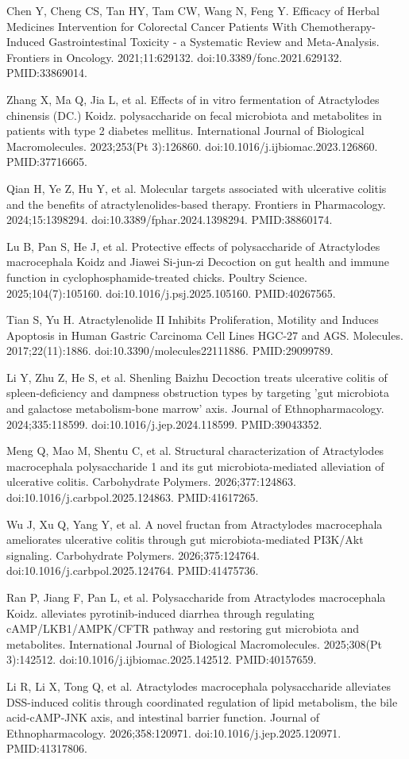 \documentclass[11pt,oneside]{book}
\newcommand{\reff}[2]{\par\hangindent=7mm\hangafter=1\noindent[#1]\hspace{2mm}#2\par}
\begin{document}
\reff{40}{Chen Y, Cheng CS, Tan HY, Tam CW, Wang N, Feng Y. Efficacy of Herbal Medicines Intervention for Colorectal Cancer Patients With Chemotherapy-Induced Gastrointestinal Toxicity - a Systematic Review and Meta-Analysis. Frontiers in Oncology. 2021;11:629132. doi:10.3389/fonc.2021.629132. PMID:33869014.}
\reff{41}{Zhang X, Ma Q, Jia L, et al. Effects of in vitro fermentation of Atractylodes chinensis (DC.) Koidz. polysaccharide on fecal microbiota and metabolites in patients with type 2 diabetes mellitus. International Journal of Biological Macromolecules. 2023;253(Pt 3):126860. doi:10.1016/j.ijbiomac.2023.126860. PMID:37716665.}
\reff{42}{Qian H, Ye Z, Hu Y, et al. Molecular targets associated with ulcerative colitis and the benefits of atractylenolides-based therapy. Frontiers in Pharmacology. 2024;15:1398294. doi:10.3389/fphar.2024.1398294. PMID:38860174.}
\reff{43}{Lu B, Pan S, He J, et al. Protective effects of polysaccharide of Atractylodes macrocephala Koidz and Jiawei Si-jun-zi Decoction on gut health and immune function in cyclophosphamide-treated chicks. Poultry Science. 2025;104(7):105160. doi:10.1016/j.psj.2025.105160. PMID:40267565.}
\reff{44}{Tian S, Yu H. Atractylenolide II Inhibits Proliferation, Motility and Induces Apoptosis in Human Gastric Carcinoma Cell Lines HGC-27 and AGS. Molecules. 2017;22(11):1886. doi:10.3390/molecules22111886. PMID:29099789.}
\reff{45}{Li Y, Zhu Z, He S, et al. Shenling Baizhu Decoction treats ulcerative colitis of spleen-deficiency and dampness obstruction types by targeting 'gut microbiota and galactose metabolism-bone marrow' axis. Journal of Ethnopharmacology. 2024;335:118599. doi:10.1016/j.jep.2024.118599. PMID:39043352.}
\reff{46}{Meng Q, Mao M, Shentu C, et al. Structural characterization of Atractylodes macrocephala polysaccharide 1 and its gut microbiota-mediated alleviation of ulcerative colitis. Carbohydrate Polymers. 2026;377:124863. doi:10.1016/j.carbpol.2025.124863. PMID:41617265.}
\reff{47}{Wu J, Xu Q, Yang Y, et al. A novel fructan from Atractylodes macrocephala ameliorates ulcerative colitis through gut microbiota-mediated PI3K/Akt signaling. Carbohydrate Polymers. 2026;375:124764. doi:10.1016/j.carbpol.2025.124764. PMID:41475736.}
\reff{48}{Ran P, Jiang F, Pan L, et al. Polysaccharide from Atractylodes macrocephala Koidz. alleviates pyrotinib-induced diarrhea through regulating cAMP/LKB1/AMPK/CFTR pathway and restoring gut microbiota and metabolites. International Journal of Biological Macromolecules. 2025;308(Pt 3):142512. doi:10.1016/j.ijbiomac.2025.142512. PMID:40157659.}
\reff{49}{Li R, Li X, Tong Q, et al. Atractylodes macrocephala polysaccharide alleviates DSS-induced colitis through coordinated regulation of lipid metabolism, the bile acid-cAMP-JNK axis, and intestinal barrier function. Journal of Ethnopharmacology. 2026;358:120971. doi:10.1016/j.jep.2025.120971. PMID:41317806.}
\end{document}
